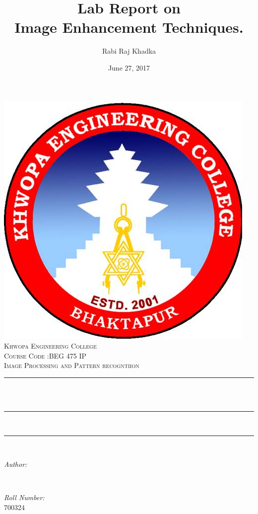 \documentclass[12pt]{article}
\title{Lab Report on \\Image Enhancement Techniques.}								%
\author{Rabi Raj Khadka}								%
\date{June 27, 2017}											%
\makeatletter
\let\thetitle\@title
\let\theauthor\@author
\let\thedate\@date
\makeatother
\begin{document}
\begin{titlepage}
	\centering
    \includegraphics[scale = 0.3]{kheclogo.jpg}\\[1.0 cm]	%
    \textsc{\LARGE Khwopa Engineering College}\\[1.5 cm]	%
	\textsc{\Large Course Code :BEG 475 IP}\\[0.5 cm]				%
	\textsc{\large Image Processing and Pattern recogntiion}\\[0.5 cm]				%
	\rule{\linewidth}{0.2 mm} \\[0.4 cm]
	{ \huge \bfseries \thetitle}\\
	\rule{\linewidth}{0.2 mm} \\[1.0 cm]
	
	
	\rule{\linewidth}{0 mm} \\[1.0 cm]

	\begin{minipage}{0.4\textwidth}
		\begin{flushleft} \large
			\emph{Author:}\\
			\theauthor
			\end{flushleft}
			\end{minipage}~
			\begin{minipage}{0.4\textwidth}
			\begin{flushright} \large
			\emph{Roll  Number:} \\
			700324									%
		\end{flushright}
	\end{minipage}\\[2cm]
	
	{\large \thedate}\\[2 cm]
 
	\vfill
	
\end{titlepage}
\tableofcontents
\pagebreak
\end{document}

